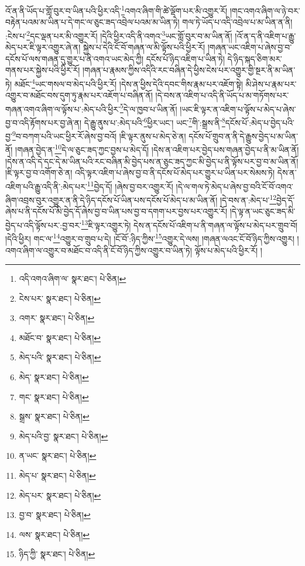 འོ་ན་ནི་ཡོད་པ་གློ་བུར་བ་ཡིན་པའི་ཕྱིར་འདི་\footnote{འདི་འགའ་ཞིག་ལ་  སྣར་ཐང་།  པེ་ཅིན། }འགའ་ཞིག་གི་ཚེ་ལྡོག་པར་མི་འགྱུར་རོ། །གང་འགའ་ཞིག་ལ་ཉེ་བར་བརྟེན་པའམ་མ་ཡིན་པ་དེ་གང་ལ་ཅུང་ཟད་འབྲེལ་པའམ་མ་ཡིན་ཏེ། གལ་ཏེ་ཡོད་པ་འདི་འབྲེལ་པ་མ་ཡིན་ན་ནི། :ངེས་པ་\footnote{ངེས་པར་  སྣར་ཐང་།  པེ་ཅིན། }དང་ལྡན་པར་མི་འགྱུར་རོ། །དེའི་ཕྱིར་འདི་ནི་འགའ་\footnote{འགར་  སྣར་ཐང་།  པེ་ཅིན། }ཡང་གློ་བུར་བ་མ་ཡིན་ནོ། །འོ་ན་ད་ནི་འཇིག་པ་རྒྱུ་མེད་པར་ཇི་ལྟར་འགྱུར་ཞེ་ན། སྐྱེས་པ་དེའི་ངོ་བོ་གཞན་ལ་མི་ལྟོས་པའི་ཕྱིར་རོ། །གཞན་ཡང་འཇིག་པ་ཞེས་བྱ་བ་དངོས་པོ་ལས་གཞན་དུ་གྱུར་པ་ནི་འགའ་ཡང་མེད་ཀྱི། དངོས་པོ་ཉིད་འཇིག་པ་ཡིན་ཏེ། དེ་ཉིད་སྐད་ཅིག་མར་གནས་པར་སྐྱེས་པའི་ཕྱིར་རོ། །གཞན་པ་རྣམས་ཀྱིས་འདིའི་རང་བཞིན་དེ་ཕྱིས་ངེས་པར་འགྱུར་གྱི་སྔར་ནི་མ་ཡིན་ཏེ། མཐོང་\footnote{མཐོང་བ་  སྣར་ཐང་།  པེ་ཅིན། }ཡང་གསལ་བ་མེད་པའི་ཕྱིར་རོ། །དེས་ན་ཕྱིས་དེའི་དབང་གིས་རྣམ་པར་འཇོག་སྟེ། མི་ཤེས་པ་རྣམ་པར་འགྱུར་བ་མཐོང་བས་དུག་ཏུ་རྣམ་པར་འཇོག་པ་བཞིན་ནོ། །དེ་བས་ན་འཇིག་པ་འདི་ནི་ཡོད་པ་མ་གཏོགས་པར་གཞན་འགའ་ཞིག་ལ་ལྟོས་པ་:མེད་པའི་ཕྱིར་\footnote{མེད་པའི་  སྣར་ཐང་།  པེ་ཅིན། }དེ་ལ་ཁྱབ་པ་ཡིན་ནོ། །ཡང་ཇི་ལྟར་ན་འཇིག་པ་ལྟོས་པ་མེད་པ་ཞེས་བྱ་བ་འདི་རྟོགས་པར་བྱ་ཞེ་ན། དེ་རྒྱུ་ནུས་པ་:མེད་པའི་\footnote{མེད་  སྣར་ཐང་།  པེ་ཅིན། }ཕྱིར་ཡང་། ཡང་\footnote{གང་  སྣར་ཐང་།  པེ་ཅིན། }གི་:སྒྲས་ནི་\footnote{སྒྲས་  སྣར་ཐང་།  པེ་ཅིན། }དངོས་པོ་:མེད་པ་བྱེད་པའི་བྱ་\footnote{མེད་པའི་བྱ་  སྣར་ཐང་།  པེ་ཅིན། }བ་བཀག་པའི་ཡང་ཕྱིར་རོ་ཞེས་བྱ་བའོ། །ཇི་ལྟར་ནུས་པ་མེད་ཅེ་ན། དངོས་པོ་གྲུབ་ན་ནི་དེ་རྒྱུས་བྱེད་པ་མ་ཡིན་ནོ། །གཞན་བྱེད་ན་\footnote{ན་ཡང་  སྣར་ཐང་།  པེ་ཅིན། }དེ་ལ་ཅུང་ཟད་ཀྱང་བྱས་པ་མེད་དོ། །དེས་ན་འཇིག་པར་བྱེད་པས་གཞན་བྱེད་པ་ནི་མ་ཡིན་ནོ། །དེས་ན་འདི་དེ་དང་དེ་མ་ཡིན་པའི་རང་བཞིན་མི་བྱེད་པས་ན་ཅུང་ཟད་ཀྱང་མི་བྱེད་པ་ནི་ལྟོས་པར་བྱ་བ་མ་ཡིན་ནོ། །ཇི་ལྟར་བྱ་བ་འགོག་ཅེ་ན། འདི་ལྟར་འཇིག་པ་ཞེས་བྱ་བ་ནི་དངོས་པོ་མེད་པར་གྱུར་པ་ཡིན་པར་སེམས་ཏེ། དེས་ན་འཇིག་པའི་རྒྱུ་འདི་ནི་:མེད་པར་\footnote{མེད་པ་  སྣར་ཐང་།  པེ་ཅིན། }བྱེད་དོ། །ཞེས་བྱ་བར་འགྱུར་རོ། །དེ་ལ་གལ་ཏེ་མེད་པ་ཞེས་བྱ་བའི་ངོ་བོ་འགའ་ཞིག་འབྲས་བུར་འགྱུར་ན་ནི་དེ་ཉིད་དངོས་པོ་ཡིན་པས་དངོས་པོ་མེད་པ་མ་ཡིན་ནོ། །དེ་བས་ན་:མེད་པ་\footnote{མེད་པར་  སྣར་ཐང་།  པེ་ཅིན། }བྱེད་དོ་ཞེས་པ་ནི་དངོས་པོ་མི་བྱེད་དོ་ཞེས་བྱ་བ་ཡིན་པས་བྱ་བ་དགག་པར་བྱས་པར་འགྱུར་རོ། །དེ་ལྟ་ན་ཡང་ཅུང་ཟད་མི་བྱེད་པ་འདི་ལྟོས་པར་:བྱ་བར་\footnote{བྱ་བ་  སྣར་ཐང་།  པེ་ཅིན། }ཇི་ལྟར་འགྱུར་ཏེ། དེས་ན་དངོས་པོ་འཇིག་པ་ནི་གཞན་ལ་ལྟོས་པ་མེད་པར་གྲུབ་བོ། །དེའི་ཕྱིར། གང་ལ་\footnote{ལས་  སྣར་ཐང་།  པེ་ཅིན། }འགྱུར་བ་གྲུབ་པ་དེ། །ངོ་བོ་:ཉིད་ཀྱིས་\footnote{ཉིད་ཀྱི་  སྣར་ཐང་།  པེ་ཅིན། }འགྱུར་དེ་ལས། །གཞན་ལའང་ངོ་བོ་ཉིད་ཀྱིས་འགྱུར། །འགའ་ཞིག་ལ་འགྱུར་བ་མཐོང་བ་འདི་ནི་ངོ་བོ་ཉིད་ཀྱིས་འགྱུར་བ་ཡིན་ཏེ། ལྟོས་པ་མེད་པའི་ཕྱིར་རོ། །
